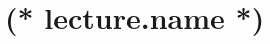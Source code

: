 \documentclass[12pt, twoside]{dgs}
\begin{document}
    \section{(* lecture.name *)}
    
\end{document}
